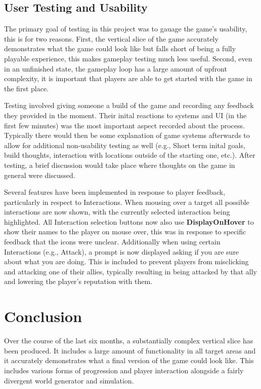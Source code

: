 \documentclass{report}
\begin{document}
\section{User Testing and Usability}

The primary goal of testing in this project was to gauage the game's usability, this is for two reasons. First, the vertical slice of the game accurately demonstrates what the game could look like but falls short of being a fully playable experience, this makes gameplay testing much less useful. Second, even in an unfinished state, the gameplay loop has a large amount of upfront complexity, it is important that players are able to get started with the game in the first place.

Testing involved giving someone a build of the game and recording any feedback they provided in the moment. Their inital reactions to systems and UI (in the first few minutes) was the most important aspect recorded about the process. Typically there would then be some explanation of game systems afterwards to allow for additional non-usability testing as well (e.g., Short term inital goals, build thoughts, interaction with locations outside of the starting one, etc.). After testing, a brief discussion would take place where thoughts on the game in general were discussed.

Several features have been implemented in response to player feedback, particularly in respect to Interactions. When mousing over a target all possible interactions are now shown, with the currently selected interaction being highlighted. All Interaction selection buttons now also use \textbf{DisplayOnHover} to show their names to the player on mouse over, this was in response to specific feedback that the icons were unclear. Additionally when using certain Interactions (e.g., Attack), a prompt is now displayed asking if you are sure about what you are doing. This is included to prevent players from misclicking and attacking one of their allies, typically resulting in being attacked by that ally and lowering the player's reputation with them.

\chapter{Conclusion}

Over the course of the last six months, a substantially complex vertical slice has been produced. It includes a large amount of functionality in all target areas and it accurately demonstrates what a final version of the game could look like. This includes various forms of progression and player interaction alongside a fairly divergent world generator and simulation.
\end{document}
